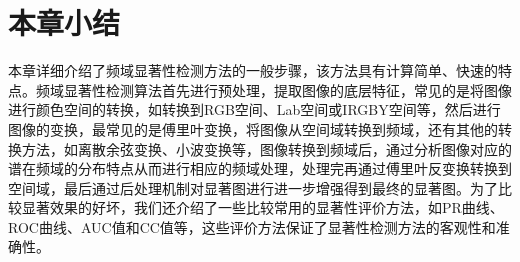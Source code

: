 \section{本章小结}
\label{2_5_5}

本章详细介绍了频域显著性检测方法的一般步骤，该方法具有计算简单、快速的特点。频域显著性检测算法首先进行预处理，提取图像的底层特征，常见的是将图像进行颜色空间的转换，如转换到RGB空间、Lab空间或IRGBY空间等，然后进行图像的变换，最常见的是傅里叶变换，将图像从空间域转换到频域，还有其他的转换方法，如离散余弦变换、小波变换等，图像转换到频域后，通过分析图像对应的谱在频域的分布特点从而进行相应的频域处理，处理完再通过傅里叶反变换转换到空间域，最后通过后处理机制对显著图进行进一步增强得到最终的显著图。为了比较显著效果的好坏，我们还介绍了一些比较常用的显著性评价方法，如PR曲线、ROC曲线、AUC值和CC值等，这些评价方法保证了显著性检测方法的客观性和准确性。
